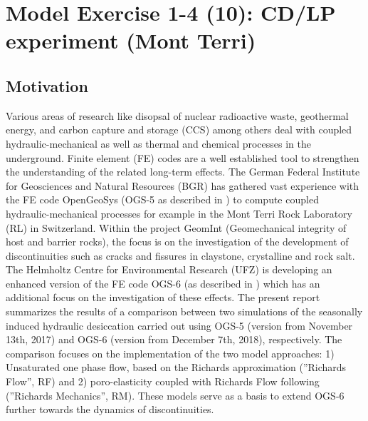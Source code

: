 \section{Model Exercise 1-4 (10): CD/LP experiment (Mont Terri)}
\label{sec:mex10}
\subsection{Motivation}
Various areas of research like disopsal of nuclear radioactive waste, geothermal energy, and carbon capture and storage (CCS) among others deal with coupled hydraulic-mechanical as well as thermal and chemical processes in the underground. Finite element (FE) codes are a well established tool to strengthen the understanding of the related long-term effects. The German Federal Institute for Geosciences and Natural Resources (BGR) has gathered vast experience with the FE code OpenGeoSys (OGS-5 as described in \cite{kolditz2012})  to compute coupled  hydraulic-mechanical processes for example in the  Mont Terri Rock Laboratory (RL) in Switzerland. Within the project GeomInt (Geomechanical integrity of host and barrier rocks), the focus is on the investigation of the development of discontinuities such as cracks and fissures in claystone, crystalline and rock salt. The Helmholtz Centre for Environmental Research (UFZ) is developing an enhanced version of the FE code OGS-6 (as described in \cite{Naumov:2018}) which has an additional focus on the investigation of these effects.   The present report summarizes the results of a comparison between two simulations of the seasonally induced hydraulic desiccation carried out using OGS-5 (version from November 13th, 2017) and OGS-6 (version from December 7th, 2018), respectively. The comparison focuses on the implementation of the two model approaches: 1) Unsaturated one phase flow, based on the Richards approximation \cite{richards1931} (”Richards Flow”, RF) and 2) poro-elasticity coupled with Richards Flow following \cite{biot1941} (”Richards Mechanics”, RM). These models serve as a basis to extend OGS-6 further towards the
dynamics of discontinuities.

